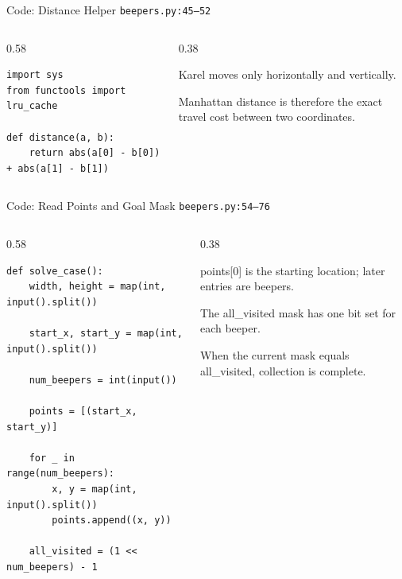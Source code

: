 \documentclass[aspectratio=169,11pt]{beamer}
\begin{document}
\begin{frame}[fragile]{Code: Distance Helper}
\scriptsize
{} \texttt{beepers.py:45--52}

\vspace{0.08cm}
\begin{columns}[T,totalwidth=\textwidth]
\begin{column}{0.58\textwidth}
\begin{lstlisting}[style=cpcode]
import sys
from functools import lru_cache

def distance(a, b):
    return abs(a[0] - b[0]) + abs(a[1] - b[1])
\end{lstlisting}
\end{column}
\begin{column}{0.38\textwidth}
\begin{tightitemize}
  \item Karel moves only horizontally and vertically.
  \item Manhattan distance is therefore the exact travel cost between two coordinates.
\end{tightitemize}
\end{column}
\end{columns}
\end{frame}

\begin{frame}[fragile]{Code: Read Points and Goal Mask}
\scriptsize
{} \texttt{beepers.py:54--76}

\vspace{0.08cm}
\begin{columns}[T,totalwidth=\textwidth]
\begin{column}{0.58\textwidth}
\begin{lstlisting}[style=cpcode]
def solve_case():
    width, height = map(int, input().split())

    start_x, start_y = map(int, input().split())

    num_beepers = int(input())

    points = [(start_x, start_y)]

    for _ in range(num_beepers):
        x, y = map(int, input().split())
        points.append((x, y))

    all_visited = (1 << num_beepers) - 1
\end{lstlisting}
\end{column}
\begin{column}{0.38\textwidth}
\begin{tightitemize}
  \item points[0] is the starting location; later entries are beepers.
  \item The all\_visited mask has one bit set for each beeper.
  \item When the current mask equals all\_visited, collection is complete.
\end{tightitemize}
\end{column}
\end{columns}
\end{frame}
\end{document}
